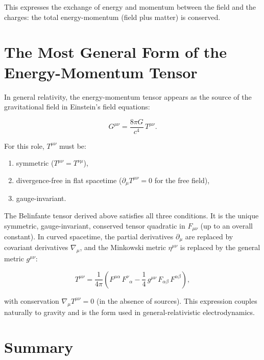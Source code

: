 This expresses the exchange of energy and momentum between the field and the charges: the total energy-momentum (field plus matter) is conserved.

\section{The Most General Form of the Energy-Momentum Tensor}

In general relativity, the energy-momentum tensor appears as the source of the gravitational field in Einstein's field equations:

\begin{equation}
G^{\mu\nu} = \frac{8\pi G}{c^4}\,T^{\mu\nu}.
\end{equation}

For this role, $T^{\mu\nu}$ must be:
\begin{enumerate}
\item symmetric ($T^{\mu\nu} = T^{\nu\mu}$),
\item divergence-free in flat spacetime ($\partial_\mu T^{\mu\nu} = 0$ for the free field),
\item gauge-invariant.
\end{enumerate}

The Belinfante tensor derived above satisfies all three conditions. It is the unique symmetric, gauge-invariant, conserved tensor quadratic in $F_{\mu\nu}$ (up to an overall constant). In curved spacetime, the partial derivatives $\partial_\mu$ are replaced by covariant derivatives $\nabla_\mu$, and the Minkowski metric $\eta^{\mu\nu}$ is replaced by the general metric $g^{\mu\nu}$:

\begin{equation}
T^{\mu\nu} = \frac{1}{4\pi}\!\left(F^{\mu\alpha}\,F^{\nu}{}_{\alpha} - \frac{1}{4}\,g^{\mu\nu}\,F_{\alpha\beta}\,F^{\alpha\beta}\right),
\end{equation}

with conservation $\nabla_\mu T^{\mu\nu} = 0$ (in the absence of sources). This expression couples naturally to gravity and is the form used in general-relativistic electrodynamics.

\section{Summary}

